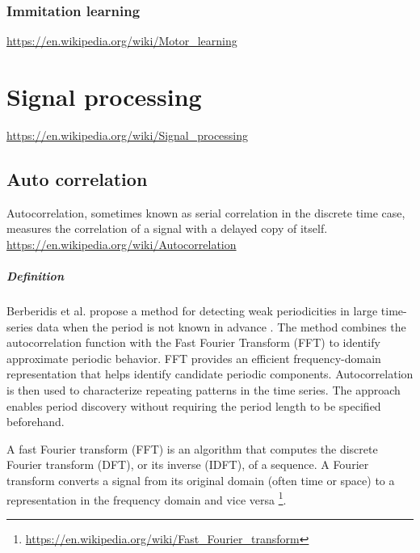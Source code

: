 \documentclass{book}
\providecommand{\seeherefooter}[1]{\footnote{\url{#1}}}
\begin{document}
% 

\subsubsection{Immitation learning}


\url{https://en.wikipedia.org/wiki/Motor_learning}

\section{Signal processing}


\url{https://en.wikipedia.org/wiki/Signal_processing}

\subsection{Auto correlation}


Autocorrelation, sometimes known as serial correlation in the discrete time case, measures the correlation of a signal with a delayed copy of itself. \url{https://en.wikipedia.org/wiki/Autocorrelation}


\subparagraph{Definition}
   Berberidis et al. propose a method for detecting weak periodicities in large time-series data when the period is not    known in advance \cite{berberidis-2002-on-the-discovery-of-weak-periodicities-in-large-time-series}. The method combines the autocorrelation function with the Fast Fourier Transform (FFT) to identify approximate periodic behavior. FFT provides an efficient frequency-domain representation that helps identify candidate periodic components. Autocorrelation is then used to characterize repeating patterns in the time series. The approach enables period discovery without requiring the period length to be specified beforehand.
   
   A fast Fourier transform (FFT) is an algorithm that computes the discrete Fourier transform (DFT), or its inverse (IDFT), of a sequence. A Fourier transform converts a signal from its original domain (often time or space) to a representation in the frequency domain and vice versa \seeherefooter{https://en.wikipedia.org/wiki/Fast_Fourier_transform}.
\end{document}
